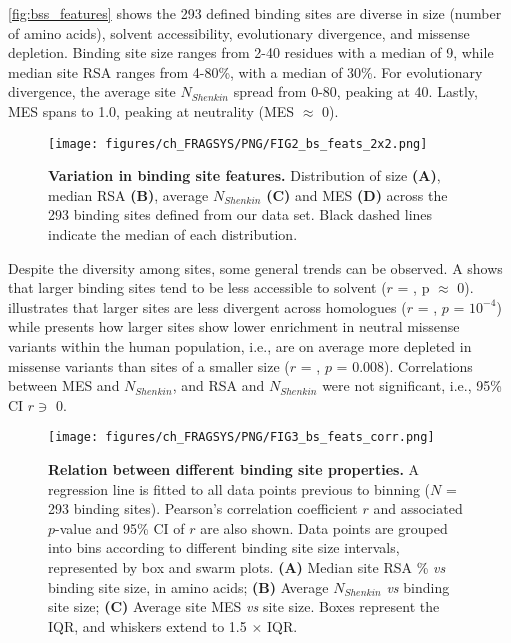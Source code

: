 \autoref{fig:bss_features} shows the 293 defined binding sites are diverse in size (number of amino acids), solvent accessibility, evolutionary divergence, and missense depletion. Binding site size ranges from 2-40 residues with a median of 9, while median site RSA ranges from 4-80\%, with a median of 30\%. For evolutionary divergence, the average site $N_{Shenkin}$ spread from 0-80, peaking at 40. Lastly, MES spans  to 1.0, peaking at neutrality (MES $\approx$ 0).

\begin{figure}[htb!]
    \centering
    \texttt{[image: figures/ch\_FRAGSYS/PNG/FIG2\_bs\_feats\_2x2.png]}
    \caption[Variation in binding site features]{\textbf{Variation in binding site features.} Distribution of size \textbf{(A)}, median RSA \textbf{(B)}, average $N_{Shenkin}$ \textbf{(C)} and MES \textbf{(D)} across the 293 binding sites defined from our data set. Black dashed lines indicate the median of each distribution.}
    \label{fig:bss_features}
\end{figure}

Despite the diversity among sites, some general trends can be observed. A shows that larger binding sites tend to be less accessible to solvent ($r$ = , p $\approx$ 0).  illustrates that larger sites are less divergent across homologues ($r$ = , $p$ = $10^{-4}$) while  presents how larger sites show lower enrichment in neutral missense variants within the human population, i.e., are on average more depleted in missense variants than sites of a smaller size ($r$ = , $p$ = 0.008). Correlations between MES and $N_{Shenkin}$, and RSA and $N_{Shenkin}$ were not significant, i.e., 95\% CI $r \ni$ 0.

\begin{figure}[htb!]
    \centering
    \texttt{[image: figures/ch\_FRAGSYS/PNG/FIG3\_bs\_feats\_corr.png]}
    \caption[Relation between different binding site properties]{\textbf{Relation between different binding site properties.} A regression line is fitted to all data points previous to binning ($N$ = 293 binding sites). Pearson’s correlation coefficient $r$ \cite{RODGERS_1988_CORRELATION} and associated $p$-value and 95\% CI of $r$ \cite{BOWLEY_1928_R_CI} are also shown. Data points are grouped into bins according to different binding site size intervals, represented by box and swarm plots. \textbf{(A)} Median site RSA \% \textit{vs} binding site size, in amino acids; \textbf{(B)} Average $N_{Shenkin}$ \textit{vs} binding site size; \textbf{(C)} Average site MES \textit{vs} site size. Boxes represent the IQR, and whiskers extend to 1.5 $\times$ IQR.}
    \label{fig:bss_feats_corr}
\end{figure}

